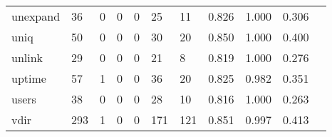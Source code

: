 \begin{longtable}{lp{1.2cm}p{1.2cm}p{1.2cm}p{1.2cm}p{1.2cm}p{1.2cm}p{1.2cm}p{1.2cm}p{1.2cm}p{1.2cm}}
unexpand  &                                    36 &                                                  0 &                                                  0 &                                                  0 &                                                 25 &                                                 11 &                                              0.826 &                                              1.000 &                                              0.306 \\
uniq      &                                    50 &                                                  0 &                                                  0 &                                                  0 &                                                 30 &                                                 20 &                                              0.850 &                                              1.000 &                                              0.400 \\
unlink    &                                    29 &                                                  0 &                                                  0 &                                                  0 &                                                 21 &                                                  8 &                                              0.819 &                                              1.000 &                                              0.276 \\
uptime    &                                    57 &                                                  1 &                                                  0 &                                                  0 &                                                 36 &                                                 20 &                                              0.825 &                                              0.982 &                                              0.351 \\
users     &                                    38 &                                                  0 &                                                  0 &                                                  0 &                                                 28 &                                                 10 &                                              0.816 &                                              1.000 &                                              0.263 \\
vdir      &                                   293 &                                                  1 &                                                  0 &                                                  0 &                                                171 &                                                121 &                                              0.851 &                                              0.997 &                                              0.413 \\

\end{longtable}
